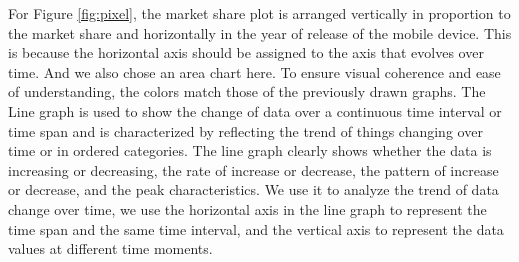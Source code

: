 \documentclass[conference]{IEEEtran}
\begin{document}
For Figure \ref{fig:pixel}, the market share plot is arranged vertically in proportion to the market share and horizontally in the year of release of the mobile device. This is because the horizontal axis should be assigned to the axis that evolves over time. And we also chose an area chart here. To ensure visual coherence and ease of understanding, the colors match those of the previously drawn graphs. The Line graph is used to show the change of data over a continuous time interval or time span and is characterized by reflecting the trend of things changing over time or in ordered categories. The line graph clearly shows whether the data is increasing or decreasing, the rate of increase or decrease, the pattern of increase or decrease, and the peak characteristics. We use it to analyze the trend of data change over time, we use the horizontal axis in the line graph to represent the time span and the same time interval, and the vertical axis to represent the data values at different time moments.



\end{document}
